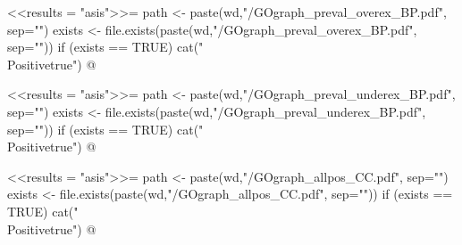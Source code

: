 \documentclass{article}
\begin{document}
\newif\ifPositive

<<results = "asis">>=
path <- paste(wd,"/GOgraph_preval_overex_BP.pdf", sep="")
exists <- file.exists(paste(wd,"/GOgraph_preval_overex_BP.pdf", sep=""))
if (exists == TRUE) {
  cat("\\Positivetrue")
}
@

\ifPositive
  \subsection{GOgraphs showing overexpressed functions from prevalent DEGs}
  This is the GO graph concerning the overexpressed prevalent DEGs (Image extracted from {\bf"GOgraph\_preval\_overex\_BP.pdf"} file):
  \begin{center}
    \texttt{[image: \\Sexpr\{path]}}
  \end{center}
\fi


\newif\ifPositive

<<results = "asis">>=
path <- paste(wd,"/GOgraph_preval_underex_BP.pdf", sep="")
exists <- file.exists(paste(wd,"/GOgraph_preval_underex_BP.pdf", sep=""))
if (exists == TRUE) {
  cat("\\Positivetrue")
}
@

\ifPositive
  \subsection{GOgraphs showing underexpressed functions from prevalent DEGs}
  This is the GO graph concerning the underexpressed prevalent DEGs (Image extracted from {\bf"GOgraph\_preval\_underex\_BP.pdf"} file):
  \begin{center}
    \texttt{[image: \\Sexpr\{path]}}
  \end{center}
\fi


\newif\ifPositive

<<results = "asis">>=
path <- paste(wd,"/GOgraph_allpos_CC.pdf", sep="")
exists <- file.exists(paste(wd,"/GOgraph_allpos_CC.pdf", sep=""))
if (exists == TRUE) {
  cat("\\Positivetrue")
}
@

\ifPositive
 \section{GO graphs of all possible DEGs: Cellular Components (CC))}
 \subsection{General GOgraph of all possible DEGs}
 This is the GO graph provided by the topGO package (Image extracted from {\bf"GOgraph\_allpos\_CC.pdf"} file):
  \begin{center}
    \texttt{[image: \\Sexpr\{path]}}
  \end{center}
\fi
\end{document}
